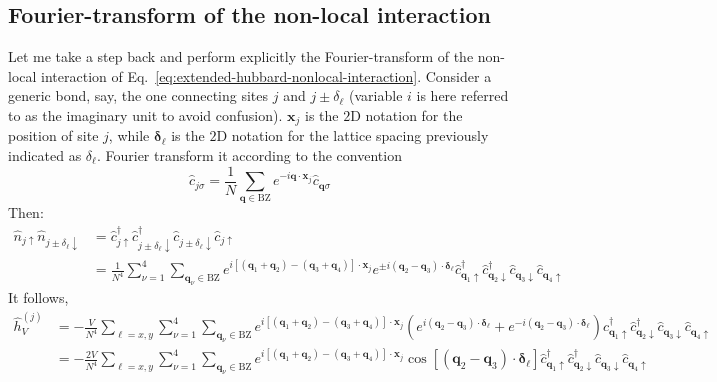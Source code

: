 \todo

\subsection{Fourier-transform of the non-local interaction}

Let me take a step back and perform explicitly the Fourier-transform of the non-local interaction of Eq.~\ref{eq:extended-hubbard-nonlocal-interaction}. Consider a generic bond, say, the one connecting sites $j$ and $j\pm\delta_\ell$ (variable $i$ is here referred to as the imaginary unit to avoid confusion). $\mathbf{x}_j$ is the $2$D notation for the position of site $j$, while $\bm{\delta}_\ell$ is the $2$D notation for the lattice spacing previously indicated as $\delta_\ell$. Fourier transform it according to the convention
\[
	\hat c_{j\sigma} = \frac{1}{N} \sum_{\mathbf{q} \in \mathrm{BZ}} e^{-i \mathbf{q} \cdot \mathbf{x}_j} \hat c_{\mathbf{q}\sigma}
\]
Then:
\[
\begin{aligned}
	\hat n_{j\uparrow} \hat n_{j \pm \delta_\ell \downarrow} &= \hat c_{j\uparrow}^\dagger \hat c_{j \pm \delta_\ell \downarrow}^\dagger \hat c_{j \pm \delta_\ell \downarrow} \hat c_{j\uparrow} \\
	&= \frac{1}{N^4} \sum_{\nu=1}^4 \sum_{\mathbf{q}_\nu \in \mathrm{BZ}} e^{i \left[ (\mathbf{q}_1 + \mathbf{q}_2) - (\mathbf{q}_3 + \mathbf{q}_4) \right] \cdot \mathbf{x}_j} e^{\pm i(\mathbf{q}_2-\mathbf{q}_3) \cdot \bm{\delta}_\ell}  \hat c_{\mathbf{q}_1 \uparrow}^\dagger \hat c_{\mathbf{q}_2 \downarrow}^\dagger \hat c_{\mathbf{q}_3 \downarrow} \hat c_{\mathbf{q}_4\uparrow}
\end{aligned}
\]
It follows,
\[
\begin{aligned}
	\hat h_V^{(j)} &= -\frac{V}{N^4} \sum_{\ell = x,y} \sum_{\nu=1}^4 \sum_{\mathbf{q}_\nu \in \mathrm{BZ}} e^{i \left[ (\mathbf{q}_1 + \mathbf{q}_2) - (\mathbf{q}_3 + \mathbf{q}_4) \right] \cdot \mathbf{x}_j} 
	\left(
		e^{ i(\mathbf{q}_2-\mathbf{q}_3) \cdot \bm{\delta}_\ell} + e^{ -i(\mathbf{q}_2-\mathbf{q}_3) \cdot \bm{\delta}_\ell} 
	\right)
	\hat c_{\mathbf{q}_1 \uparrow}^\dagger \hat c_{\mathbf{q}_2 \downarrow}^\dagger \hat c_{\mathbf{q}_3 \downarrow} \hat c_{\mathbf{q}_4\uparrow} \\
	&= -\frac{2V}{N^4} \sum_{\ell = x,y} \sum_{\nu=1}^4 \sum_{\mathbf{q}_\nu \in \mathrm{BZ}} e^{i \left[ (\mathbf{q}_1 + \mathbf{q}_2) - (\mathbf{q}_3 + \mathbf{q}_4) \right] \cdot \mathbf{x}_j} \cos\left[
		(\mathbf{q}_2-\mathbf{q}_3) \cdot \bm{\delta}_\ell
	\right]	\hat c_{\mathbf{q}_1 \uparrow}^\dagger \hat c_{\mathbf{q}_2 \downarrow}^\dagger \hat c_{\mathbf{q}_3 \downarrow} \hat c_{\mathbf{q}_4\uparrow}
\end{aligned}
\]
